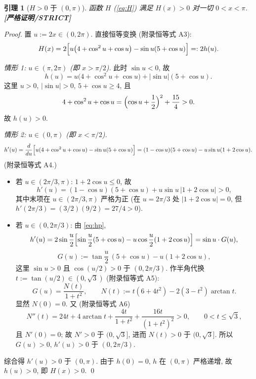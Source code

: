 \documentclass[UTF8]{ctexart}
\newtheorem{lemma}[theorem]{引理}
\newcommand{\STRICT}{\textbf{[严格证明/STRICT]}}
\begin{document}
\begin{lemma}[$H>0$ 于 $(0,\pi)$]\label{lem:H}
	函数 $H$ (\ref{eq:H}) 满足 $H(x)>0$ 对一切 $0<x<\pi$. \STRICT{}
\end{lemma}

\begin{proof}
	置 $u:=2x\in(0,2\pi)$. 直接恒等变换 (附录恒等式 A3):
	\begin{equation}
		H(x)=2\Bigl[u\bigl(4+\cos^2u+\cos u\bigr)-\sin u(5+\cos u)\Bigr]
		=:2h(u).
		\label{eq:H-u}
	\end{equation}

	\emph{情形 1: $u\in(\pi,2\pi)$ (即 $x>\pi/2$).} 此时 $\sin u<0$, 故
	\begin{equation}
		h(u)=u\bigl(4+\cos^2u+\cos u\bigr)+|\sin u|(5+\cos u).
	\end{equation}
	这里 $u>0$, $|\sin u|>0$, $5+\cos u\ge4$, 且
	\begin{equation}
		4+\cos^2u+\cos u=\Bigl(\cos u+\frac12\Bigr)^2+\frac{15}{4}>0.
	\end{equation}
	故 $h(u)>0$. \checkmark

	\emph{情形 2: $u\in(0,\pi)$ (即 $x<\pi/2$).}
	\begin{equation}
		h'(u)=\frac{d}{du}\Bigl[u(4+\cos^2u+\cos u)-\sin u(5+\cos u)\Bigr]
		=(1-\cos u)(5+\cos u)-u\sin u(1+2\cos u).
		\label{eq:hp}
	\end{equation}
	(附录恒等式 A4.)
	\begin{itemize}
		\item 若 $u\in(2\pi/3,\pi)$: $1+2\cos u\le0$, 故
			\begin{equation}
				h'(u)=(1-\cos u)(5+\cos u)+u\sin u\,|1+2\cos u|>0,
			\end{equation}
			其中末项在 $u\in(2\pi/3,\pi)$ 严格为正 (在 $u=2\pi/3$ 处
			$|1+2\cos u|=0$, 但 $h'(2\pi/3)=(3/2)(9/2)=27/4>0$).
		\item 若 $u\in(0,2\pi/3)$: 由 \eqref{eq:hp},
			\begin{equation}
				h'(u)=2\sin\frac u2\Bigl[
					\sin\frac u2(5+\cos u)-u\cos\frac u2(1+2\cos u)\Bigr]
				=\sin u\cdot G(u),
			\end{equation}
			\begin{equation}
				G(u):=\tan\frac u2\,(5+\cos u)-u(1+2\cos u),
			\end{equation}
			这里 $\sin u>0$ 且 $\cos(u/2)>0$ 于 $(0,2\pi/3)$.
			作半角代换 $t:=\tan(u/2)\in(0,\sqrt3)$ (附录恒等式 A5):
			\begin{equation}
				G(u)=\frac{N(t)}{1+t^2},\qquad
				N(t):=t(6+4t^2)-2(3-t^2)\arctan t.
			\end{equation}
			显然 $N(0)=0$. 又 (附录恒等式 A6)
			\begin{equation}
				N''(t)=24t+4\arctan t+\frac{4t}{1+t^2}+\frac{16t}{(1+t^2)^2}>0,
				\qquad 0<t\le\sqrt3,
			\end{equation}
			且 $N'(0)=0$; 故 $N'>0$ 于 $(0,\sqrt3]$, 进而 $N(t)>0$ 于 $(0,\sqrt3]$.
			所以 $G(u)>0$, $h'(u)>0$ 于 $(0,2\pi/3)$.
	\end{itemize}
	综合得 $h'(u)>0$ 于 $(0,\pi)$. 由于 $h(0)=0$, $h$ 在 $(0,\pi)$ 严格递增,
	故 $h(u)>0$, 即 $H(x)>0$. \qed
\end{proof}
\end{document}
